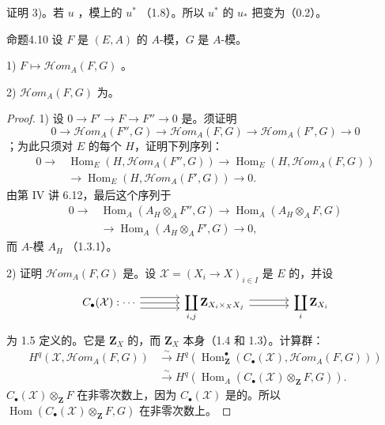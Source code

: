 证明 3)。若 $u$ ，模上的 $u^*$ （1.8）。所以 $u^*$ 的 $u_*$ 把变为（0.2）。
\begin{SGAresult}{命题}{4.10}
设 $F$ 是 $(E,A)$ 的 $A$-模，$G$ 是 $A$-模。

1)  $F\mapsto\mathscr{H}om_A(F,G)$ 。

2)  $\mathscr{H}om_A(F,G)$ 为。
\end{SGAresult}
\begin{proof}
1) 设 $0\to F'\to F\to F''\to0$ 是。须证明
\[
 0\longrightarrow\mathscr{H}om_A(F'',G)\longrightarrow\mathscr{H}om_A(F,G)
 \longrightarrow\mathscr{H}om_A(F',G)\longrightarrow0
\]
；为此只须对 $E$ 的每个 $H$，证明下列序列：
\[
\begin{split}
 0\longrightarrow&\operatorname{Hom}_E(H,\mathscr{H}om_A(F'',G))
 \longrightarrow\operatorname{Hom}_E(H,\mathscr{H}om_A(F,G))\\
 &\longrightarrow\operatorname{Hom}_E(H,\mathscr{H}om_A(F',G))\longrightarrow0.
\end{split}
\]
由第 IV 讲 6.12，最后这个序列于
\[
\begin{split}
 0\longrightarrow&\operatorname{Hom}_A(A_H\otimes_AF'',G)
 \longrightarrow\operatorname{Hom}_A(A_H\otimes_AF,G)\\
 &\longrightarrow\operatorname{Hom}_A(A_H\otimes_AF',G)\longrightarrow0,
\end{split}
\]
而 $A$-模 $A_H$ （1.3.1）。

2) 证明 $\mathscr{H}om_A(F,G)$ 是。设 $\mathcal X=(X_i\to X)_{i\in I}$
是 $E$ 的，并设
\[
\begin{tikzcd}[column sep=large]
 C_\bullet(\mathcal X):\cdots\arrow[r,shift left=2]\arrow[r]\arrow[r,shift right=2]&
 \displaystyle\coprod_{i,j}\mathbf Z_{X_i\times_X X_j}
 \arrow[r,shift left=1]\arrow[r,shift right=1]&\displaystyle\coprod_i\mathbf Z_{X_i}
\end{tikzcd}
\]
为 1.5 定义的。它是 $\mathbf Z_X$ 的，而 $\mathbf Z_X$ 本身（1.4 和 1.3）。计算群：
\[
\begin{split}
 H^q(\mathcal X,\mathscr{H}om_A(F,G))
 &\xrightarrow{\sim}H^q(\operatorname{Hom}_{\mathbf Z}^{\bullet}(C_\bullet(\mathcal X),\mathscr{H}om_A(F,G)))\\
 &\xrightarrow{\sim}H^q(\operatorname{Hom}_A(C_\bullet(\mathcal X)\otimes_{\mathbf Z}F,G)).
\end{split}
\]
 $C_\bullet(\mathcal X)\otimes_{\mathbf Z}F$ 在非零次数上，因为 $C_\bullet(\mathcal X)$ 是的。所以 $\operatorname{Hom}(C_\bullet(\mathcal X)\otimes_{\mathbf Z}F,G)$ 在非零次数上。
\end{proof}
